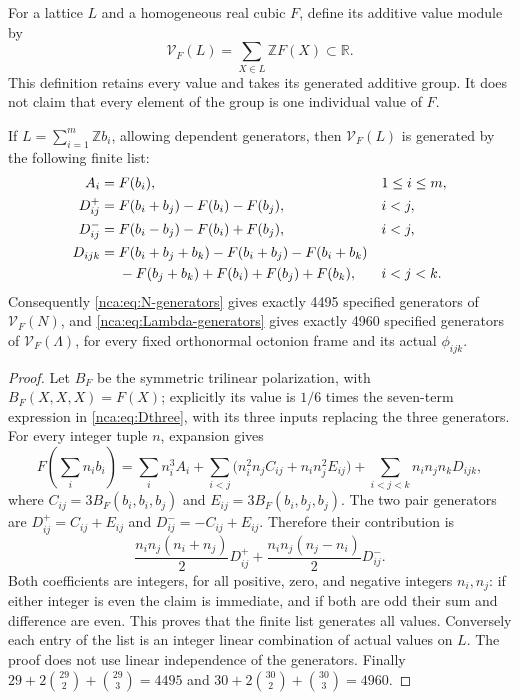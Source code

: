For a lattice \(L\) and a homogeneous real cubic \(F\), define
its additive value module by
\[
 \mathcal V_F(L)=\sum_{X\in L}\mathbb ZF(X)\subset\mathbb R.
\]
This definition retains every value and takes its generated additive
group. It does not claim that every element of the group is one
individual value of \(F\).

\begin{theorem}
\label{nca:thm:finite-values}
If \(L=\sum_{i=1}^m\mathbb Zb_i\), allowing dependent generators,
then \(\mathcal V_F(L)\) is generated by the following finite list:
\begin{align}
 A_i={}&F(b_i),&&1\leq i\leq m,\label{nca:eq:single}\\
 D^+_{ij}={}&F(b_i+b_j)-F(b_i)-F(b_j),&&i<j,\label{nca:eq:Dplus}\\
 D^-_{ij}={}&F(b_i-b_j)-F(b_i)+F(b_j),&&i<j,\label{nca:eq:Dminus}\\
 D_{ijk}={}&F(b_i+b_j+b_k)-F(b_i+b_j)-F(b_i+b_k)\notag\\
          &{}-F(b_j+b_k)+F(b_i)+F(b_j)+F(b_k),&&i<j<k.
 \label{nca:eq:Dthree}
\end{align}
Consequently \eqref{nca:eq:N-generators} gives exactly 4495
specified generators of \(\mathcal V_F(N)\), and
\eqref{nca:eq:Lambda-generators} gives exactly 4960 specified
generators of \(\mathcal V_F(\Lambda)\), for every fixed
orthonormal octonion frame and its actual \(\phi_{ijk}\).
\end{theorem}

\begin{proof}
Let \(B_F\) be the symmetric trilinear polarization, with
\(B_F(X,X,X)=F(X)\); explicitly its value is
\(1/6\) times the seven-term expression in
\eqref{nca:eq:Dthree}, with its three inputs replacing the three
generators. For every integer tuple \(n\), expansion gives
\[
 F\left(\sum_i n_ib_i\right)
 =\sum_i n_i^3A_i
 +\sum_{i<j}\bigl(n_i^2n_j C_{ij}+n_in_j^2 E_{ij}\bigr)
 +\sum_{i<j<k}n_in_jn_kD_{ijk},
\]
where \(C_{ij}=3B_F(b_i,b_i,b_j)\) and
\(E_{ij}=3B_F(b_i,b_j,b_j)\).  The two pair generators are
\(D^+_{ij}=C_{ij}+E_{ij}\) and
\(D^-_{ij}=-C_{ij}+E_{ij}\). Therefore their contribution is
\[
 \frac{n_in_j(n_i+n_j)}2D^+_{ij}
       +\frac{n_in_j(n_j-n_i)}2D^-_{ij}.
\]
Both coefficients are integers, for all positive, zero, and negative
integers \(n_i,n_j\): if either integer is even the claim is immediate,
and if both are odd their sum and difference are even. This proves
that the finite list generates all values. Conversely each entry
of the list is an integer linear combination of actual values on
\(L\). The proof does not use linear independence of the generators.
Finally \(29+2\binom{29}{2}+\binom{29}{3}=4495\) and
\(30+2\binom{30}{2}+\binom{30}{3}=4960\).
\end{proof}


